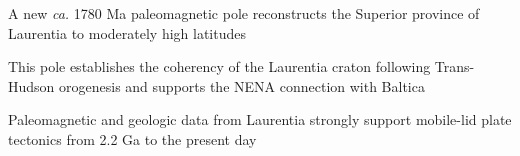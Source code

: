 \documentclass[draft]{agujournal2019}
\begin{document}








\begin{keypoints}
\item A new \textit{ca.} 1780 Ma paleomagnetic pole  reconstructs the Superior province of Laurentia to moderately high latitudes
\item This pole establishes the coherency of the Laurentia craton following Trans-Hudson orogenesis and supports the NENA connection with Baltica
\item Paleomagnetic and geologic data from Laurentia strongly support mobile-lid plate tectonics from 2.2 Ga to the present day
\end{keypoints}

%
%
\end{document}
